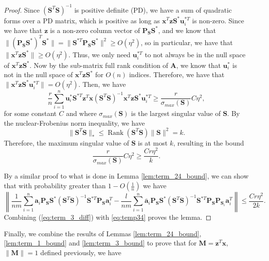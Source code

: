 \documentclass[twoside,11pt]{article}
\DeclareMathOperator\rank{Rank}
\begin{document}
\begin{proof}
	Since $(\bm{S}^T\bm{S})^{-1}$ is positive definite (PD), we have a sum of quadratic forms over a PD matrix, which is positive as long as $\bm{x}^T\bm{z}\bm{S}^{*}\bm{u}_i^{*T}$ is non-zero. Since we have that $\bm{z}$ is a non-zero column vector of $\bm{P}_{\bm{S}}\bm{S}^{*}$, and we know that $\|(\bm{P}_{\bm{S}}\bm{S}^{*})^T\bm{S}^{*}\|=\|\bm{S}^{*T}\bm{P}_{\bm{S}}\bm{S}^{*}\|^2\geq O(\eta^2)$, so in particular, we have that $\|\bm{x}^T\bm{z}\bm{S}^{*}\|\geq O(\eta^2)$. Thus, we only need $\bm{u}_i^{*T}$ to not always be in the null space of $\bm{x}^T\bm{z}\bm{S}^{*}$. Now by the sub-matrix full rank condition of $\bm{A}$, we know that $\bm{u}_i^*$ is not in the null space of $\bm{x}^T\bm{z}\bm{S}^{*}$ for $O(n)$ indices. Therefore, we have that $\|\bm{x}^T\bm{z}\bm{S}^{*}\bm{u}_i^{*T}\|=O(\eta^2)$. Then, we have 
	$$\frac{r}{n}\sum_{i=1}^n \bm{u}_i^{*}\bm{S}^{*T} \bm{z}^T\bm{x}(\bm{S}^T\bm{S})^{-1} \bm{x}^T\bm{z}\bm{S}^{*}\bm{u}_i^{*T}
	\geq \frac{r}{\sigma_{max}(\bm{S})} C\eta^2,$$
	for some constant $C$ and where $\sigma_{max}(\bm{S})$ is the largest singular value of $\bm{S}$. By the nuclear-Frobenius norm inequality, we have \[\|\bm{S}^T\bm{S}\|_*\leq \rank(\bm{S}^T\bm{S})\|\bm{S}\|^2=k.\]
	Therefore, the maximum singular value of $\bm{S}$ is at most $k$, resulting in the bound
	\begin{equation}   \frac{r}{\sigma_{max}(\bm{S})} C\eta^2 \geq  \frac{Cr\eta^2}{k}.
	\label{eq:temp34}
	\end{equation}
	
	By a similar proof to what is done in Lemma \ref{lem:term_24_bound}, we can show that with probability greater than $1- O(\frac{1}{n})$ we have
	\begin{equation}
	\left\|\frac{1}{nm}\sum_{i=1}^n \bm{a}_i \bm{P}_{\bm{S}}\bm{S}^*(\bm{S}^T\bm{S})^{-1} \bm{S}^{*T}\bm{P}_{\bm{S}}\bm{a}_i^T -\frac{l}{nm}\sum_{i=1}^n \overline{\bm{a}}_i \bm{P}_{\bm{S}}\bm{S}^*(\bm{S}^T\bm{S})^{-1} \bm{S}^{*T}\bm{P}_{\bm{S}}\bm{P}_{\bm{S}_i}\bm{a}_i^T \right\|\leq \frac{Cr\eta^2}{2k}. \label{eq:term_3_diff}
	\end{equation}
	Combining (\ref{eq:term_3_diff}) with \eqref{eq:temp34} proves  the lemma.
\end{proof}
Finally, we combine the results of  Lemmas \ref{lem:term_24_bound}, \ref{lem:term_1_bound} and \ref{lem:term_3_bound} to prove that for $\bm{M}=\bm{z}^T\bm{x}$, $\|\bm{M}\|=1$ defined previously, we have
\end{document}
